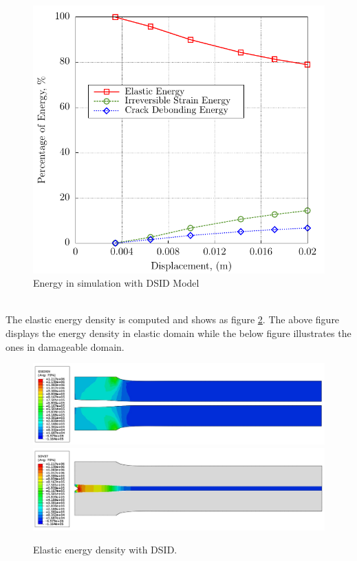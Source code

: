 \documentclass[preprint,review,12pt]{elsarticle}
\begin{document}
\begin{figure}[htbp]
{\begin{minipage}[b]{0.48\textwidth}
\includegraphics[width=\textwidth]{Abaqus/Energy/plot_DSID_EP.pdf}
\end{minipage}}
\caption{Energy in simulation with DSID Model}
\label{fig:DSIDEnergy}
\end{figure}
\
\\
The elastic energy density is computed and shows as figure \ref{fig:DSIDESEDEN}. The above figure displays the energy density in elastic domain while the below figure illustrates the ones in damageable domain.
\
\\
\begin{figure}[htbp]
   \centering
  \includegraphics[width=\textwidth]{Abaqus/DSID/DSID_ESEDEN_elas.jpg}
  \includegraphics[width=\textwidth]{Abaqus/DSID/DSID_SDV37_damage.jpg}
   \caption{Elastic energy density with DSID. }
   \label{fig:DSIDESEDEN}
\end{figure}
\end{document}
